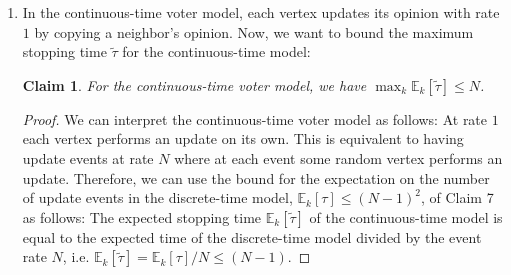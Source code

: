 \documentclass[a4paper]{amsart}
\theoremstyle{theorem}
\newtheorem{claim}{Claim}
\theoremstyle{definition}
\newcommand{\E}{\mathbb{E}}
\begin{document}
\begin{enumerate}[label=\alph*)]
	
	\item In the continuous-time voter model, each vertex updates its opinion with rate $1$ by copying a neighbor's opinion.
	Now, we want to bound the maximum stopping time $\tilde{\tau}$ for the continuous-time model:
	\begin{claim}
		For the continuous-time voter model, we have $\max_k \E_k[\tilde{\tau}] \leq N$.
	\end{claim}
	\begin{proof}
		We can interpret the continuous-time voter model as follows:
		At rate $1$ each vertex performs an update on its own.
		This is equivalent to having update events at rate $N$ where at each event some random vertex performs an update.
		Therefore, we can use the bound for the expectation on the number of update events in the discrete-time model, $\E_k[\tau]\leq (N-1)^2$, of Claim 7 as follows:
		The expected stopping time $\E_k[\tilde{\tau}]$ of the continuous-time model is equal to the expected time of the discrete-time model divided by the event rate $N$, i.e. $\E_k[\tilde{\tau}] = \E_k[\tau]/N\leq (N-1)$.
	\end{proof}
\end{enumerate}
\end{document}
